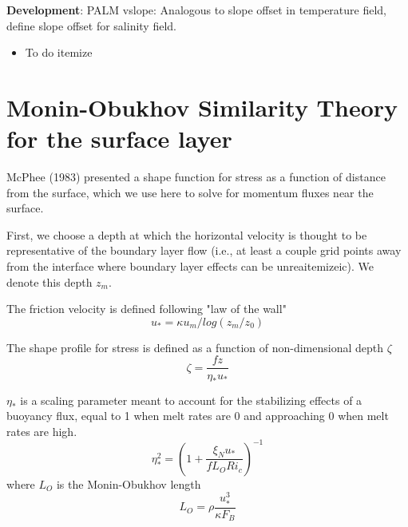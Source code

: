 \documentclass[letterpaper,10pt]{report}
\newcommand{\code}[1]{\texttt{#1}} %
\begin{document}
	\textbf{Development}:
	PALM vslope: Analogous to slope offset in temperature field, define slope offset for salinity field.
	\begin{itemize}
		\item To do itemize
	\end{itemize}
	\newpage		
	\section{Monin-Obukhov Similarity Theory for the surface layer}
    McPhee (1983) presented a shape function for stress as a function of distance from the surface, which we use here to solve for momentum fluxes near the surface. 
    
    First, we choose a depth at which the horizontal velocity is thought to be representative of the boundary layer flow (i.e., at least a couple grid points away from the interface where boundary layer effects can be unreaitemizeic). We denote this depth $z_m$. 
    
    The friction velocity is defined following "law of the wall"
    \begin{equation}
        u_* = \kappa u_m / log(z_m/z_0)
    \end{equation}
    
    The shape profile for stress is defined as a function of non-dimensional depth $\zeta$
    \begin{equation}
        \zeta = \frac{f z}{\eta_* u_*}
    \end{equation}
    
    $\eta_*$ is a scaling parameter meant to account for the stabilizing effects of a buoyancy flux, equal to 1 when melt rates are 0 and approaching 0 when melt rates are high.
    \begin{equation}
        \eta_*^2 = (1+\frac{\xi_N u_*}{f L_O Ri_c})^{-1}
    \end{equation}
    where $L_O$ is the Monin-Obukhov length
    \begin{equation}
        L_O = \rho \frac{u_*^3}{\kappa F_{B}}
    \end{equation}
    
\end{document}

